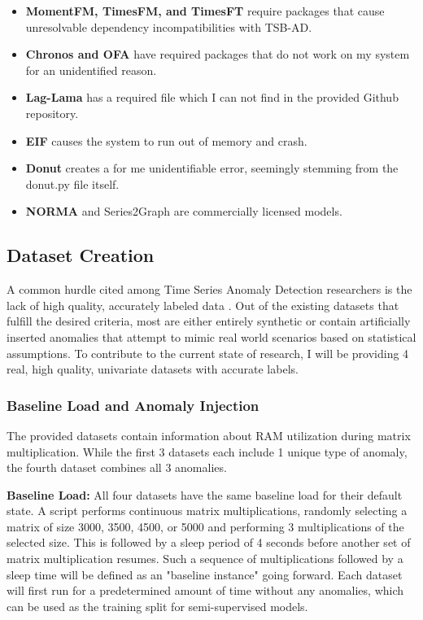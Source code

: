 \documentclass[12pt,oneside]{article}
\begin{document}
\begin{itemize}
    \item \textbf{MomentFM, TimesFM, and TimesFT} require packages that cause unresolvable dependency incompatibilities with TSB-AD.
    \item \textbf{Chronos and OFA} have required packages that do not work on my system for an unidentified reason. 
    \item \textbf{Lag-Lama} has a required file which I can not find in the provided Github repository.
    \item \textbf{EIF} causes the system to run out of memory and crash.
    \item \textbf{Donut} creates a for me unidentifiable error, seemingly stemming from the donut.py file itself.
    \item \textbf{NORMA} and Series2Graph are commercially licensed models. 
\end{itemize}

\subsection{Dataset Creation}

A common hurdle cited among Time Series Anomaly Detection researchers is the lack of high quality, accurately labeled data \parencites[p.~2]{liu2024elephant}[p.~1-6]{wu2021current}[p.~1]{paparrizos2022tsb}. Out of the existing datasets that fulfill the desired criteria, most are either entirely synthetic or contain artificially inserted anomalies that attempt to mimic real world scenarios based on statistical assumptions. To contribute to the current state of research, I will be providing 4 real, high quality, univariate datasets with accurate labels. \par

\subsubsection{Baseline Load and Anomaly Injection}

The provided datasets contain information about RAM utilization during matrix multiplication. While the first 3 datasets each include 1 unique type of anomaly, the fourth dataset combines all 3 anomalies. \par
\textbf{Baseline Load:} All four datasets have the same baseline load for their default state. A script performs continuous matrix multiplications, randomly selecting a matrix of size 3000, 3500, 4500, or 5000 and performing 3 multiplications of the selected size. This is followed by a sleep period of 4 seconds before another set of matrix multiplication resumes. Such a sequence of multiplications followed by a sleep time will be defined as an "baseline instance" going forward. Each dataset will first run for a predetermined amount of time without any anomalies, which can be used as the training split for semi-supervised models.
\end{document}
